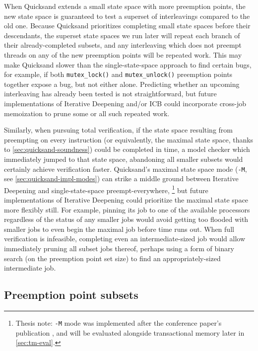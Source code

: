 When Quicksand extends a small state space with more preemption points,
the new state space is guaranteed to test a superset of interleavings compared to the old one.
Because Quicksand prioritizes completing small state spaces before their descendants,
the superset state spaces we run later will repeat each branch of their already-completed subsets,
and any interleaving which does not preempt threads on any of the new preemption points will be repeated work.
%
This may make Quicksand slower than the single-state-space approach to find certain bugs,
for example, if both {\tt mutex\_lock()} and {\tt mutex\_unlock()} preemption points
together expose a bug, but not either alone.
Predicting whether an upcoming interleaving has already been tested is not straightforward,
but future implementations
of Iterative Deepening and/or ICB
could incorporate cross-job memoization
to prune some or all such repeated work.

Similarly, when pursuing total verification,
if the state space resulting from preempting on every instruction
(or equivalently, the maximal state space, thanks to \cref{sec:quicksand-soundness})
could be completed in time,
a model checker which immediately jumped to that state space,
abandoning all smaller subsets would certainly achieve verification faster.
Quicksand's maximal state space mode ({\tt -M}, see \cref{sec:quicksand-impl-modes})
can strike a middle ground between Iterative Deepening and single-state-space preempt-everywhere,%
\footnote{Thesis note: {\tt -M} mode was implemented after the conference paper's publication \cite{quicksand},
and will be evaluated alongside transactional memory later in \cref{sec:tm-eval}.}
but future implementations of Iterative Deepening could prioritize the maximal state space more flexibly still.
For example, pinning its job to one of the available processors regardless of the status of any smaller jobs
would avoid getting too flooded with smaller jobs to even begin the maximal job before time runs out.
When full verification is infeasible,
completing even an intermediate-sized job would allow immediately pruning all subset jobs thereof,
perhaps using a form of binary search (on the preemption point set size) to find an appropriately-sized intermediate job.

\subsection{Preemption point subsets}
\label{sec:quicksand-discussion-subsets}

